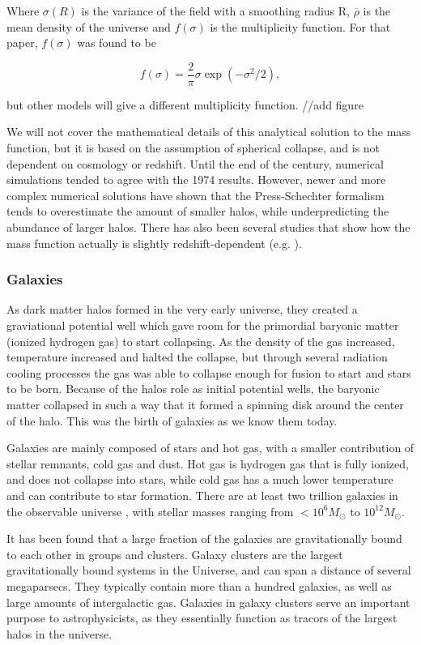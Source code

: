 Where $\sigma (R)$ is the variance of the field with a smoothing radius R, $\overline{\rho}$ is the mean density of the universe and $f(\sigma)$ is the multiplicity function. For that paper, $f(\sigma)$ was found to be

\begin{equation}
    f(\sigma) = \frac{2}{\pi} \sigma \exp(-\sigma^2/2),
\end{equation}

but other models will give a different multiplicity function.
//add figure

We will not cover the mathematical details of this analytical solution to the mass function, but it is based on the assumption of spherical collapse, and is not dependent on cosmology or redshift. Until the end of the century, numerical simulations tended to agree with the 1974 results. However, newer and more complex numerical solutions have shown that the Press-Schechter formalism tends to overestimate the amount of smaller halos, while underpredicting the abundance of larger halos. There has also been several studies that show how the mass function actually is slightly redshift-dependent (e.g. \cite{Tinker2008}).

\subsubsection{Galaxies}
As dark matter halos formed in the very early universe, they created a graviational potential well which gave room for the primordial baryonic matter (ionized hydrogen gas) to start collapsing. As the density of the gas increased, temperature increased and halted the collapse, but through several radiation cooling processes the gas was able to collapse enough for fusion to start and stars to be born. Because of the halos role as initial potential wells, the baryonic matter collapsed in such a way that it formed a spinning disk around the center of the halo. This was the birth of galaxies as we know them today.

Galaxies are mainly composed of stars and hot gas, with a smaller contribution of stellar remnants, cold gas and dust. Hot gas is hydrogen gas that is fully ionized, and does not collapse into stars, while cold gas has a much lower temperature and can contribute to star formation. There are at least two trillion galaxies in the observable universe \parencite{Conselice2016}, with stellar masses ranging from $<10^6 M_{\odot}$ to $10^{12} M_{\odot}$. 

It has been found that a large fraction of the galaxies are gravitationally bound to each other in groups and clusters. %
Galaxy clusters are the largest gravitationally bound systems in the Universe, and can span a distance of several megaparsecs. They typically contain more than a hundred galaxies, as well as large amounts of intergalactic gas. Galaxies in galaxy clusters serve an important purpose to astrophysicists, as they essentially function as tracors of the largest halos in the universe.

